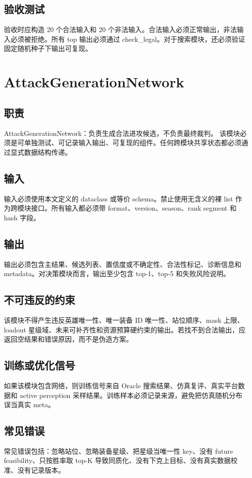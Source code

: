 \documentclass[UTF8,12pt,openany]{ctexbook}
\begin{document}
\subsection{验收测试}
验收时应构造 20 个合法输入和 20 个非法输入。合法输入必须正常输出，非法输入必须被拒绝。所有 top 输出必须通过 check\_legal。对于搜索模块，还必须验证固定随机种子下输出可复现。

\section{AttackGenerationNetwork}
\subsection{职责}
AttackGenerationNetwork：负责生成合法进攻候选，不负责最终裁判。 该模块必须是可单独测试、可记录输入输出、可复现的组件。任何跨模块共享状态都必须通过显式数据结构传递。

\subsection{输入}
输入必须使用本文定义的 dataclass 或等价 schema。禁止使用无含义的裸 list 作为跨模块接口。所有输入都必须带 format、version、season、rank segment 和 hash 字段。

\subsection{输出}
输出必须包含主结果、候选列表、置信度或不确定性、合法性标记、诊断信息和 metadata。对决策模块而言，输出至少包含 top-1、top-5 和失败风险说明。

\subsection{不可违反的约束}
该模块不得产生违反英雄唯一性、唯一装备 ID 唯一性、站位顺序、mask 上限、loadout 星级域、未来可补齐性和资源预算硬约束的输出。若找不到合法输出，应返回空结果和错误原因，而不是伪造方案。

\subsection{训练或优化信号}
如果该模块包含网络，则训练信号来自 Oracle 搜索结果、仿真复评、真实平台数据和 active perception 采样结果。训练样本必须记录来源，避免把仿真随机分布误当真实 meta。

\subsection{常见错误}
常见错误包括：忽略站位、忽略装备星级、把星级当唯一性 key、没有 future feasibility、只按胜率取 top-K 导致同质化、没有下克上目标、没有真实数据校准、没有记录版本。
\end{document}

